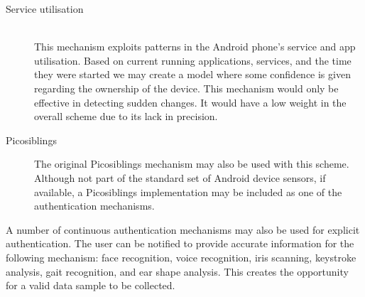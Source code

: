 \begin{description}
   \item[Service utilisation] \hfill \\
  This mechanism exploits patterns in the Android phone's service and app utilisation. Based on current running applications, services, and the time they were started we may create a model where some confidence is given regarding the ownership of the device. This mechanism would only be effective in detecting sudden changes. It would have a low weight in the overall scheme due to its lack in precision. 
  
  \item[Picosiblings]
  The original Picosiblings mechanism may also be used with this scheme. Although not part of the standard set of Android device sensors, if available, a Picosiblings implementation may be included as one of the authentication mechanisms.
\end{description}

A number of continuous authentication mechanisms may also be used for explicit authentication. The user can be notified to provide accurate information for the following mechanism: face recognition, voice recognition, iris scanning, keystroke analysis, gait recognition, and ear shape analysis. This creates the opportunity for a valid data sample to be collected.

